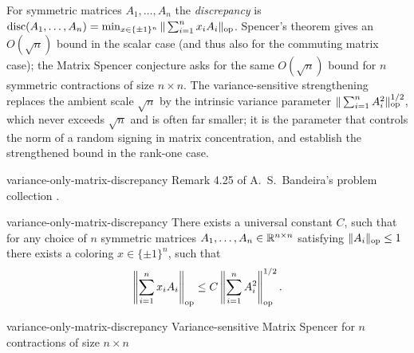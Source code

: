 

\begin{cxcredits}
\end{cxcredits}

\begin{cxcontext}
For symmetric matrices $A_1,\ldots,A_n$ the \emph{discrepancy} is $\operatorname{disc}(A_1,\ldots,A_n)=\min_{x\in\{\pm1\}^n}\|\sum_{i=1}^nx_iA_i\|_{\rm op}$.  Spencer's theorem gives an $O(\sqrt n)$ bound in the scalar case (and thus also for the commuting matrix case); the Matrix Spencer conjecture asks for the same $O(\sqrt n)$ bound for $n$ symmetric contractions of size $n\times n$.  The variance-sensitive strengthening replaces the ambient scale $\sqrt n$ by the intrinsic variance parameter $\|\sum_{i=1}^nA_i^2\|_{\rm op}^{1/2}$, which never exceeds $\sqrt n$ and is often far smaller; it is the parameter that controls the norm of a random signing in matrix concentration, and \citet{kyng2020four} establish the strengthened bound in the rank-one case.  
\end{cxcontext}


\begin{cxsource}{variance-only-matrix-discrepancy}
Remark 4.25 of A.~S.~Bandeira's problem collection \citeyearpar{Bandeira2016}.
\end{cxsource}

\begin{cxstatement}{variance-only-matrix-discrepancy}
There exists a universal constant $C$, such that for any choice of $n$ symmetric matrices $A_1,\ldots,A_n\in\mathbb R^{n\times n}$ satisfying $\|A_i\|_{\rm op}\le1$ there exists a coloring $x\in\{\pm1\}^n$, such that
\[\left\|\sum_{i=1}^nx_iA_i\right\|_{\rm op}\le C\left\|\sum_{i=1}^nA_i^2\right\|_{\rm op}^{1/2}.\]
\end{cxstatement}

\begin{cxsummary}{variance-only-matrix-discrepancy}
Variance-sensitive Matrix Spencer for $n$ contractions of size $n\times n$ \cite{Bandeira2016}
\end{cxsummary}

